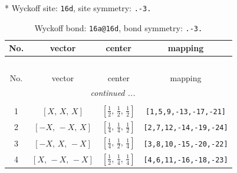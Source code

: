\documentclass[fleqn,8pt]{jsarticle}
\begin{document}
* Wyckoff site: {\tt 16d}, site symmetry: {\tt .-3.}
\renewcommand{\arraystretch}{1.2}
\begin{longtable}{cccc}
\caption{Wyckoff bond: {\tt 16a@16d}, bond symmetry: {\tt .-3.}}
 \\
 \hline \hline
No. & vector & center & mapping \\ \hline \endfirsthead

\multicolumn{3}{l}{\tablename\ \thetable{}} \\
 \hline \hline
No. & vector & center & mapping \\ \hline \endhead

 \hline \hline
\multicolumn{3}{r}{\footnotesize\it continued ...} \\ \endfoot

 \hline \hline
\multicolumn{3}{r}{} \\ \endlastfoot

1 & $\left[ X,\, X,\, X \right]$ & $\left[ \frac{1}{2},\, \frac{1}{2},\, \frac{1}{2} \right]$ & {\tt [1,5,9,-13,-17,-21]} \\ \hline
2 & $\left[ - X,\, - X,\, X \right]$ & $\left[ \frac{1}{4},\, \frac{1}{4},\, \frac{1}{2} \right]$ & {\tt [2,7,12,-14,-19,-24]} \\ \hline
3 & $\left[ - X,\, X,\, - X \right]$ & $\left[ \frac{1}{4},\, \frac{1}{2},\, \frac{1}{4} \right]$ & {\tt [3,8,10,-15,-20,-22]} \\ \hline
4 & $\left[ X,\, - X,\, - X \right]$ & $\left[ \frac{1}{2},\, \frac{1}{4},\, \frac{1}{4} \right]$ & {\tt [4,6,11,-16,-18,-23]} \\
\end{longtable}
\renewcommand{\arraystretch}{1.2}
\end{document}

